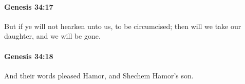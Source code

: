 		\paragraph{Genesis 34:17} %
			\label{GENESIS-34-17}

			But if ye will not hearken unto us, to be circumcised; then will we take our daughter, and we will be gone.


		\paragraph{Genesis 34:18} %
			\label{GENESIS-34-18}

			And their words pleased Hamor, and Shechem Hamor's son.


